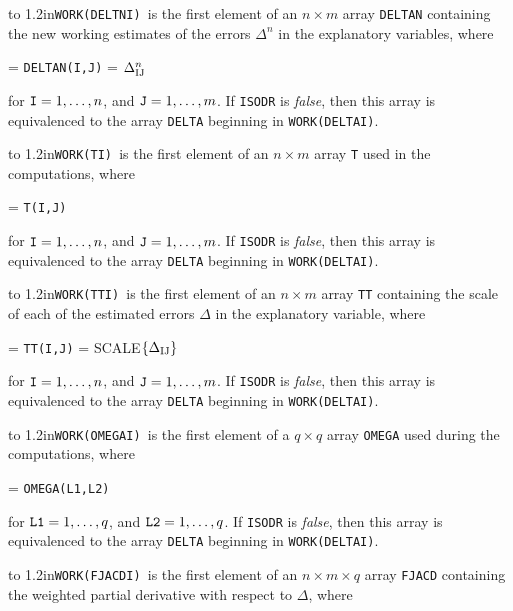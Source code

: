 \hangindent\wd\mybox{}\noindent\hbox to
1.2in{\hfill\tt WORK(DELTNI) }is the first element of an $n \times m$ array {\tt DELTAN} containing the new working estimates of the errors $\Delta^n$ in the explanatory variables, where

 = {\tt DELTAN(I,J)} = $\Delta^n_{\rm
IJ}$ 

\aligntobox for ${\tt I} = 1,\ldots,n$, and ${\tt J} = 1,\ldots,m$. If {\tt ISODR} is {\it false\/}, then this array is equivalenced to the array {\tt DELTA} beginning in {\tt WORK(DELTAI)}.
\bigskip

\hangindent\wd\mybox{}\noindent\hbox to
1.2in{\hfill\tt WORK(TI) }is the first element of an $n \times m$ array {\tt T} used in the computations, where

 = {\tt T(I,J)}

\aligntobox for ${\tt I} = 1,\ldots,n$, and ${\tt J} = 1,\ldots,m$. If {\tt ISODR} is {\it false\/}, then this array is equivalenced to the array {\tt DELTA} beginning in {\tt WORK(DELTAI)}.
\bigskip

\hangindent\wd\mybox{}\noindent\hbox to
1.2in{\hfill\tt WORK(TTI) }is the first element of an $n \times m$ array {\tt TT} containing the scale of each of the estimated errors $\Delta$ in the explanatory variable, where

 = {\tt TT(I,J)} = {\smallcaps SCALE}$\{\Delta_{\rm IJ}\}$ 

\aligntobox for ${\tt I} = 1,\ldots,n$, and ${\tt J} = 1,\ldots,m$. If {\tt ISODR} is {\it false\/}, then this array is equivalenced to the array {\tt DELTA} beginning in {\tt WORK(DELTAI)}.
\bigskip

\hangindent\wd\mybox{}\noindent\hbox to
1.2in{\hfill\tt WORK(OMEGAI) }is the first element of a $q \times q$ array {\tt OMEGA} used during the computations, where

 = {\tt OMEGA(L1,L2)}

\aligntobox for ${\tt L1} = 1,\ldots,q$, and ${\tt L2} = 1,\ldots,q$. If {\tt ISODR} is {\it false\/}, then this array is equivalenced to the array {\tt DELTA} beginning in {\tt WORK(DELTAI)}.
\bigskip

\hangindent\wd\mybox{}\noindent\hbox to
1.2in{\hfill\tt WORK(FJACDI) }is the first element of an $n \times m \times q$ array {\tt FJACD} containing the weighted partial derivative with respect to $\Delta$, where

